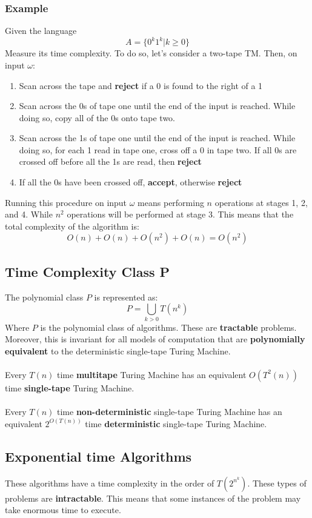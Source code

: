 \documentclass{article}
\begin{document}
\subsubsection{Example}
Given the language
\[ A = \{ 0^k1^k|k \geq 0 \} \]
Measure its time complexity. To do so, let's consider a two-tape TM. Then, on input $\omega$:

\begin{enumerate}
	\item Scan across the tape and \textbf{reject} if a 0 is found to the right of a 1
	\item Scan across the 0s of tape one until the end of the input is reached. While doing so, copy all of the 0s onto tape two.
	\item Scan across the 1s of tape one until the end of the input is reached. While doing so, for each 1 read in tape one, cross off a 0 in tape two. If all 0s are crossed off before all the 1s are read, then \textbf{reject}
	\item If all the 0s have been crossed off, \textbf{accept}, otherwise \textbf{reject}
\end{enumerate}
Running this procedure on input $\omega$ means performing $n$ operations at stages 1, 2, and 4. While $n^2$ operations will be performed at stage 3. This means that the total complexity of the algorithm is:
\[ O(n) + O(n) + O(n^2) + O(n) = O(n^2) \]

\subsection{Time Complexity Class P}
The polynomial class $P$ is represented as:
\[ P = \bigcup_{k > 0} T(n^k) \]
Where $P$ is the polynomial class of algorithms. These are \textbf{tractable} problems. Moreover, this is invariant for all models of computation that are \textbf{polynomially equivalent} to the deterministic single-tape Turing Machine. \\ \\
Every $T(n)$ time \textbf{multitape} Turing Machine has an equivalent $O(T^2(n))$ time \textbf{single-tape} Turing Machine. \\ \\
Every $T(n)$ time \textbf{non-deterministic} single-tape Turing Machine has an equivalent $2^{O(T(n))}$ time \textbf{deterministic} single-tape Turing Machine. 

\subsection{Exponential time Algorithms}
These algorithms have a time complexity in the order of $T(2^{n^k})$. These types of problems are \textbf{intractable}. This means that some instances of the problem may take enormous time to execute.
\end{document}

